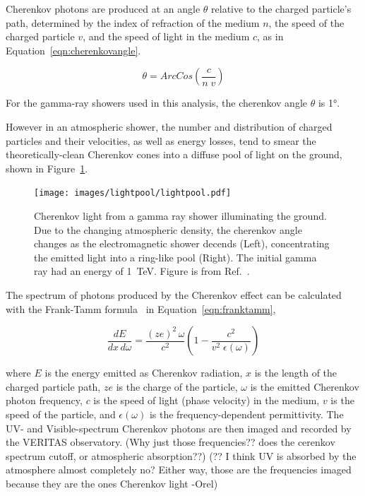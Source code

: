   Cherenkov photons are produced at an angle $\theta$ relative to the charged particle's path, determined by the index of refraction of the medium $n$, the speed of the charged particle $v$, and the speed of light in the medium $c$, as in Equation~\ref{eqn:cherenkovangle}.

  \begin{equation}\label{eqn:cherenkovangle}
    \theta = ArcCos \left ( \frac{c}{n \; v} \right )
  \end{equation}
  
  For the gamma-ray showers used in this analysis, the cherenkov angle $\theta$ is \nicetilde\ang{1}.

  However in an atmospheric shower, the number and distribution of charged particles and their velocities, as well as energy losses, tend to smear the theoretically-clean Cherenkov cones into a diffuse pool of light on the ground, shown in Figure~\ref{fig:lightpool}.

  \begin{figure}[ht]
    \centering
    \texttt{[image: images/lightpool/lightpool.pdf]}
    \caption[Chernekov Light Pool]{
      Cherenkov light from a gamma ray shower illuminating the ground.
      Due to the changing atmospheric density, the cherenkov angle changes as the electromagnetic shower decends (Left), concentrating the emitted light into a ring-like pool (Right).
      The initial gamma ray had an energy of \SI{1}{\TeV}.
      Figure is from Ref.~\cite{Voelk}.
    }
    \label{fig:lightpool}
  \end{figure}
  
  The spectrum of photons produced by the Cherenkov effect can be calculated with the Frank-Tamm formula~\cite{franktamm1,franktamm2} in Equation~\ref{eqn:franktamm},
  
  \begin{equation}\label{eqn:franktamm}
    \frac{dE}{dx\,d\omega}=\frac{(ze)^2 \, \omega}{c^2} \left ( 1 - \frac{c^2}{v^2 \;\epsilon(\omega)} \right )
  \end{equation}
  
  where $E$ is the energy emitted as Cherenkov radiation, $x$ is the length of the charged particle path, $ze$ is the charge of the particle, $\omega$ is the emitted Cherenkov photon frequency, $c$ is the speed of light (phase velocity) in the medium, $v$ is the speed of the particle, and $\epsilon(\omega)$ is the frequency-dependent permittivity.
  The UV- and Visible-spectrum Cherenkov photons are then imaged and recorded by the VERITAS observatory.
  {\color{red}(Why just those frequencies?? does the cerenkov spectrum cutoff, or atmospheric absorption??)}
  {\color{red}(?? I think UV is absorbed by the atmosphere almost completely no?  Either way, those are the frequencies imaged because they are the ones Cherenkov light -Orel)}
  

